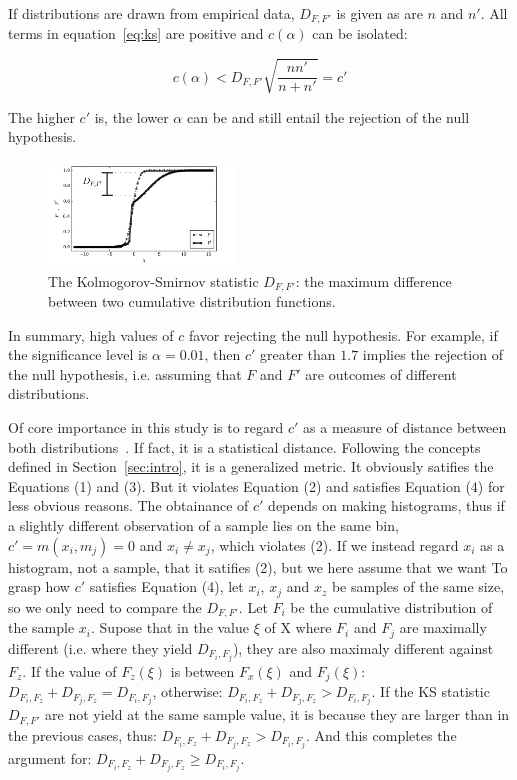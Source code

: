 \documentclass[12pt,fleqn]{article}
\begin{document}
If distributions are drawn from empirical data, $D_{F,F'}$ is given as are $n$ and $n'$.
All terms in equation~\ref{eq:ks} are positive and $c(\alpha)$ can be isolated:

\begin{equation}\label{eq:ks2}
	c(\alpha) < D_{F,F'}\sqrt{\frac{nn'}{n+n'}} = c'
\end{equation}

The higher $c'$ is, the lower $\alpha$ can be and still entail the rejection of the null hypothesis.

\begin{figure}[!h]
	\centering
	\includegraphics[width=0.44\textwidth]{../figs/Dnn}
	\caption{The Kolmogorov-Smirnov statistic $D_{F,F'}$: the maximum difference between
		two cumulative distribution functions.}
	\label{fig:dnn}
\end{figure}

In summary,
high values of $c$ favor rejecting the null hypothesis.
For example, if the significance level is $\alpha=0.01$,
then $c'$ greater than $1.7$
implies the rejection of the null hypothesis,
i.e. assuming that $F$ and $F'$
are outcomes of different distributions.

Of core importance in this study is to regard $c'$
as a measure of distance between both distributions~\cite{kolm}.
If fact, it is a statistical distance.
Following the concepts defined in Section~\ref{sec:intro},
it is a generalized metric.
It obviously satifies the Equations (1) and (3).
But it violates Equation (2) and satisfies Equation (4) for less obvious reasons.
The obtainance of $c'$ depends on making histograms,
thus if a slightly different observation of a sample lies on the same bin,
$c'=m(x_i,m_j) = 0$  and $x_i \neq x_j$, which violates (2).
If we instead regard $x_i$ as a histogram, not a sample,
that it satifies (2), but we here assume that we want 
To grasp how $c'$ satisfies Equation (4),
let $x_i$, $x_j$ and $x_z$ be samples of the same size,
so we only need to compare the $D_{F,F'}$.
Let $F_i$ be the cumulative distribution of the sample $x_i$.
Supose that in the value $\xi$ of X where $F_i$ and $F_j$ are maximally different (i.e. where they yield $D_{F_i,F_j}$),
they are also maximaly different against $F_z$.
If the value of $F_z(\xi)$ is between $F_x(\xi)$ and $F_j(\xi)$:
$D_{F_i,F_z}+D_{F_j,F_z} = D_{F_i,F_j}$,
otherwise:
$D_{F_i,F_z}+D_{F_j,F_z} > D_{F_i,F_j}$.
If the KS statistic $D_{F,F'}$ are not yield at the same sample value,
it is because they are larger than in the previous cases, thus:
$D_{F_i,F_z}+D_{F_j,F_z} > D_{F_i,F_j}$.
And this completes the argument for:
$D_{F_i,F_z}+D_{F_j,F_z} \geq D_{F_i,F_j}$.
\end{document}
